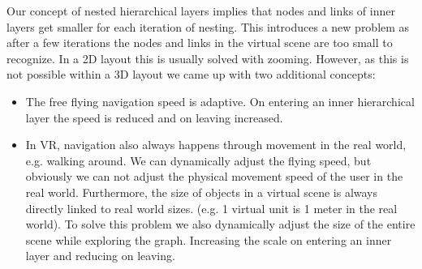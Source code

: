 Our concept of nested hierarchical layers implies that nodes and links of inner layers get smaller for each iteration of nesting. This introduces a new problem as after a few iterations the nodes and links in the virtual scene are too small to recognize. In a 2D layout this is usually solved with zooming. However, as this is not possible within a 3D layout we came up with two additional concepts: 
\begin{itemize}
    \item The free flying navigation speed is adaptive. On entering an inner hierarchical layer the speed is reduced and on leaving increased.
    \item In VR, navigation also always happens through movement in the real world, e.g. walking around. We can dynamically adjust the flying speed, but obviously we can not adjust the physical movement speed of the user in the real world. Furthermore, the size of objects in a virtual scene is always directly linked to real world sizes. (e.g. 1 virtual unit is 1 meter in the real world). To solve this problem we also dynamically adjust the size of the entire scene while exploring the graph. Increasing the scale on entering an inner layer and reducing on leaving. 
\end{itemize}


